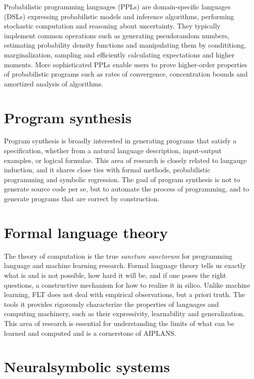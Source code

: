 \documentclass{article}
\begin{document}
    Probabilistic programming languages (PPLs) are domain-specific languages (DSLs) expressing probabilistic models and inference algorithms, performing stochastic computation and reasoning about uncertainty. They typically implement common operations such as generating pseudorandom numbers, estimating probability density functions and manipulating them by condititiong, marginalization, sampling and efficiently calculating expectations and higher moments. More sophisticated PPLs enable users to prove higher-order properties of probabilistic programs such as rates of convergence, concentration bounds and amortized analysis of algorithms.

    \section*{Program synthesis}

    Program synthesis is broadly interested in generating programs that satisfy a specification, whether from a natural language description, input-output examples, or logical formulae. This area of research is closely related to langauge induction, and it shares close ties with formal methods, probabilistic programming and symbolic regression. The goal of program synthesis is not to generate source code per se, but to automate the process of programming, and to generate programs that are correct by construction.

    \section*{Formal language theory}

    The theory of computation is the true \textit{sanctum sanctorum} for programming language and machine learning research. Formal language theory tells us exactly what is and is not possible, how hard it will be, and if one poses the right questions, a constructive mechanism for how to realize it in silico. Unlike machine learning, FLT does not deal with empirical observations, but a priori truth. The tools it provides rigorously characterize the properties of languages and computing machinery, such as their expressivity, learnability and generalization. This area of research is essential for understanding the limits of what can be learned and computed and is a cornerstone of AIPLANS.

    \section*{Neuralsymbolic systems}
\end{document}
